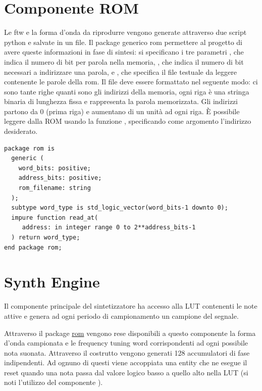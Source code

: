 \section{Componente ROM}
\label{sec:rom}
Le ftw e la forma d'onda da riprodurre vengono generate attraverso due
script python e salvate in un file.
Il package generico rom permettere al progetto di avere queste informazioni in fase di sintesi: si specificano i tre parametri , che indica il numero di bit per parola nella memoria, , che indica il numero di bit necessari a indirizzare una parola, e , che specifica il file testuale da leggere contenente le parole della rom.
Il file deve essere formattato nel seguente modo: ci sono tante righe quanti sono gli indirizzi della memoria, ogni riga è una stringa binaria
di lunghezza fissa e rappresenta la parola memorizzata.
Gli indirizzi partono da 0 (prima riga) e aumentano di un unità ad ogni riga.
È possibile leggere dalla ROM usando la funzione , specificando come argomento l'indirizzo desiderato.

\begin{verbatim}
package rom is
  generic (
    word_bits: positive;
    address_bits: positive;
    rom_filename: string
  );
  subtype word_type is std_logic_vector(word_bits-1 downto 0);
  impure function read_at(
     address: in integer range 0 to 2**address_bits-1
  ) return word_type;
end package rom;
\end{verbatim}

\section{Synth Engine}
\label{sec:synthengine}

\begin{center}
\end{center}


Il componente principale del sintetizzatore ha accesso alla LUT contenenti le note attive e genera ad ogni periodo di campionamento
un campione del segnale.

Attraverso il package \hyperref[sec:rom]{rom} vengono rese disponibili a questo componente la forma d'onda campionata e le frequency
tuning word corrispondenti ad ogni possibile nota suonata.
Attraverso il costrutto  vengono generati 128 accumulatori di fase indipendenti. Ad ognuno di questi viene accoppiata
una entity che ne esegue il reset quando una nota passa dal valore logico basso a quello alto nella LUT
(si noti l'utilizzo del componente \hyperref[sec:lowhigh]{}).

